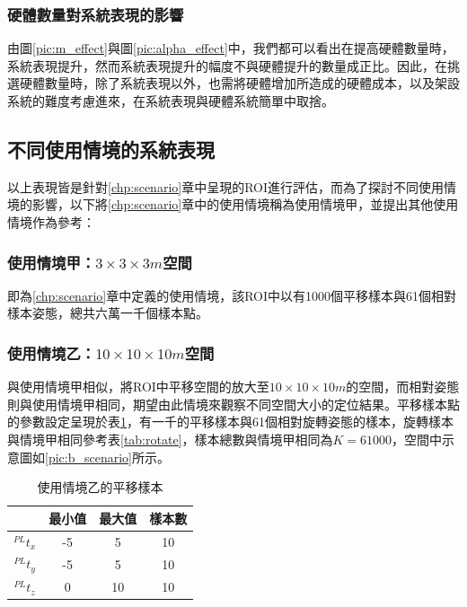 \subsubsection{硬體數量對系統表現的影響}
\label{chp:amount_effect}

由圖\ref{pic:m_effect}與圖\ref{pic:alpha_effect}中，我們都可以看出在提高硬體數量時，系統表現提升，然而系統表現提升的幅度不與硬體提升的數量成正比。因此，在挑選硬體數量時，除了系統表現以外，也需將硬體增加所造成的硬體成本，以及架設系統的難度考慮進來，在系統表現與硬體系統簡單中取捨。




\subsection{不同使用情境的系統表現}
以上表現皆是針對\ref{chp:scenario}章中呈現的ROI進行評估，而為了探討不同使用情境的影響，以下將\ref{chp:scenario}章中的使用情境稱為使用情境甲，並提出其他使用情境作為參考：

\subsubsection{使用情境甲：$3\times 3\times 3m$空間}

即為\ref{chp:scenario}章中定義的使用情境，該ROI中以有1000個平移樣本與61個相對樣本姿態，總共六萬一千個樣本點。

\subsubsection{使用情境乙：$10\times 10\times 10m$空間}

與使用情境甲相似，將ROI中平移空間的放大至$10\times 10\times 10m$的空間，而相對姿態則與使用情境甲相同，期望由此情境來觀察不同空間大小的定位結果。平移樣本點的參數設定呈現於表\ref{tab:B_translate}，有一千的平移樣本與61個相對旋轉姿態的樣本，旋轉樣本與情境甲相同參考表\ref{tab:rotate}，樣本總數與情境甲相同為$K=61000$，空間中示意圖如\ref{pic:b_scenario}所示。

\begin{table}[htpb]
    \begin{center}
      \caption{使用情境乙的平移樣本}
      \label{tab:B_translate}
      \begin{tabular}{c|c|c|c} %
         & \textbf{最小值} & \textbf{最大值}&\textbf{樣本數}\\
        \hline
        $^{PL}t_x$ & -5 & 5&10\\
        $^{PL}t_y$ & -5 & 5&10\\
        $^{PL}t_z$ & 0 & 10 &10\\
      \end{tabular}
    \end{center}
  \end{table}

